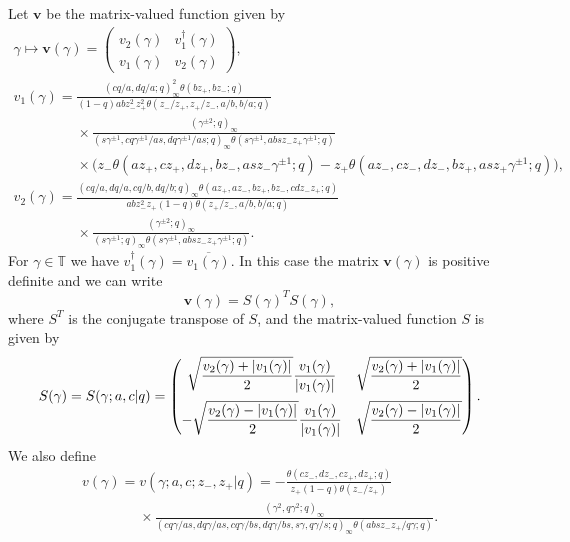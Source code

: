 \documentclass[pdftex]{sigma}
\numberwithin{equation}{section}
\numberwithin{theorem}{section}
\numberwithin{proposition}{section}
\numberwithin{lemma}{section}
\numberwithin{corollary}{section}
\numberwithin{definition}{section}
\numberwithin{example}{section}
\numberwithin{remark}{section}
\numberwithin{note}{section}
\newcommand{\T}{\mathbb T}
\begin{document}
Let $\mathbf v$ be the matrix-valued function given by
\begin{gather*}
\gamma \mapsto \mathbf v(\gamma) =
\begin{pmatrix}
v_2(\gamma) & v_1^\dagger(\gamma) \\
v_1(\gamma) & v_2(\gamma)
\end{pmatrix},
\\
v_1(\gamma) = \frac{ (cq/a, dq/a;q)_\infty^2 \theta(bz_+,bz_-;q) }{(1-q)abz_-^2z_+^2 \theta(z_-/z_+,z_+/z_-,a/b,b/a;q)}\\
\phantom{v_1(\gamma) =}{} \times \frac{(\gamma^{\pm2};q)_\infty}{(s\gamma^{\pm1}, cq\gamma^{\pm1}/as, dq\gamma^{\pm1}/as;q)_\infty \theta(s\gamma^{\pm1},absz_- z_+\gamma^{\pm 1};q)}\\
\phantom{v_1(\gamma) =}{} \times \Big( z_-\theta(az_+, cz_+, dz_+, bz_-, asz_-\gamma^{\pm1};q) -  z_+\theta(az_-, cz_-, dz_-, bz_+, asz_+\gamma^{\pm1};q)  \Big),\\
v_2(\gamma) = \frac{(cq/a,dq/a,cq/b,dq/b;q)_\infty \theta(az_+, az_-, bz_+, bz_-, cdz_- z_+;q) }{abz_-^2z_+(1-q)\theta(z_+/z_-,a/b,b/a;q)} \\
\phantom{v_2(\gamma) =}{} \times \frac{ (\gamma^{\pm2};q)_\infty }{ (s\gamma^{\pm1};q)_\infty \theta(s\gamma^{\pm1}, absz_- z_+\gamma^{\pm1};q) }.
\end{gather*}
For $\gamma \in \T$ we have $v_1^\dagger(\gamma)=\overline{v_1(\gamma)}$. In this case the matrix $\mathbf v(\gamma)$ is positive def\/inite and we can write
\[
\mathbf v(\gamma) = S(\gamma)^T S(\gamma),
\]
where $S^T$ is the conjugate transpose of $S$, and the matrix-valued function $S$ is given by
\[
S(\gamma)=S(\gamma;a,c|q) =
\begin{pmatrix}
\sqrt{\dfrac{v_2(\gamma)+|v_1(\gamma)|}{2}} \dfrac{ v_1(\gamma) }{|v_1(\gamma)|} & \sqrt{\dfrac{v_2(\gamma)+|v_1(\gamma)|}{2}} \vspace{2mm}\\
- \sqrt{\dfrac{v_2(\gamma)-|v_1(\gamma)|}{2}} \dfrac{ v_1(\gamma) }{|v_1(\gamma)|} & \sqrt{\dfrac{v_2(\gamma)-|v_1(\gamma)|}{2}}
\end{pmatrix}.
\]
We also def\/ine
\begin{gather*}
v(\gamma) = v(\gamma;a,c;z_-,z_+|q)=  -\frac{\theta(cz_-, dz_-, cz_+, dz_+;q)}{z_+(1-q) \theta(z_-/z_+) } \\
\phantom{v(\gamma) = }{} \times
 \frac{(\gamma^2,q\gamma^2;q)_\infty}{ (cq\gamma/as, dq\gamma/as, cq\gamma/bs, dq\gamma/bs, s\gamma, q\gamma/s;q)_\infty  \theta(absz_- z_+/q\gamma;q) }.
\end{gather*}
\end{document}
